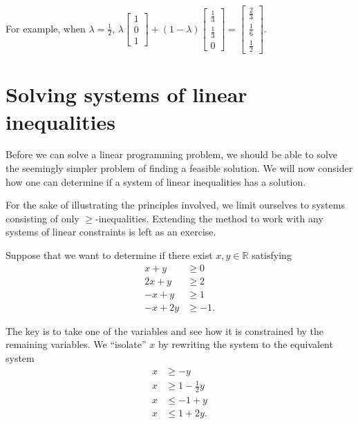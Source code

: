 \documentclass[]{book}
\theoremstyle{definition}
\theoremstyle{definition}
\theoremstyle{remark}
\begin{document}
\begin{enumerate}
  For example, when \(\lambda = \frac{1}{2}\),
  \(\lambda \begin{bmatrix} 1 \\ 0 \\ 1\end{bmatrix} + (1-\lambda)\begin{bmatrix} \frac{1}{3} \\ \frac{1}{3} \\ 0 \end{bmatrix} = \begin{bmatrix} \frac{2}{3} \\ \frac{1}{6} \\ \frac{1}{2}\end{bmatrix}\).
\end{enumerate}

\chapter{Solving systems of linear
inequalities}\label{solving-systems-of-linear-inequalities}

Before we can solve a linear programming problem, we should be able to
solve the seemingly simpler problem of finding a feasible solution. We
will now consider how one can determine if a system of linear
inequalities has a solution.

For the sake of illustrating the principles involved, we limit ourselves
to systems consisting of only \(\geq\)-inequalities. Extending the
method to work with any systems of linear constraints is left as an
exercise.

Suppose that we want to determine if there exist \(x,y\in\mathbb{R}\)
satisfying
\begin{align*}
x + y & \geq 0 \\
2x + y & \geq 2 \\
-x + y  & \geq 1 \\
-x + 2y & \geq -1.
\end{align*}

The key is to take one of the variables and see how it is constrained by
the remaining variables. We ``isolate'' \(x\) by rewriting the system to
the equivalent system
\begin{align*}
x & \geq -y  \\
x & \geq 1 - \frac{1}{2}y \\
x & \leq -1 +y \\
x & \leq 1 + 2y.
\end{align*}
\end{document}
